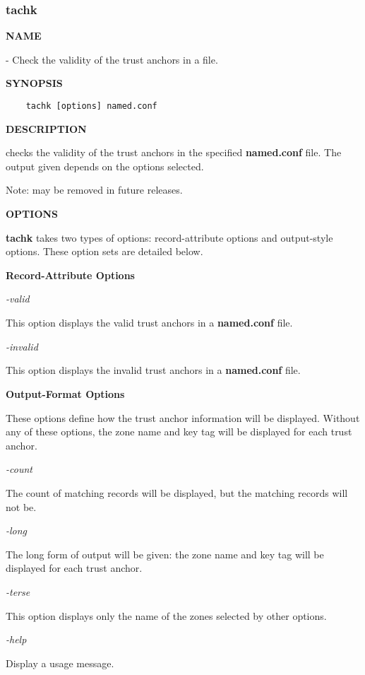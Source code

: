 \clearpage

\subsubsection{\bf tachk}

{\bf NAME}

 - Check the validity of the trust anchors in a 
file.

{\bf SYNOPSIS}

\begin{verbatim}
    tachk [options] named.conf
\end{verbatim}

{\bf DESCRIPTION}

 checks the validity of the trust anchors in the specified
{\bf named.conf} file.  The output given depends on the options selected.

Note:   may be removed in future releases.

{\bf OPTIONS}

{\bf tachk} takes two types of options:  record-attribute options
and output-style options.  These option sets are detailed below.

{\bf Record-Attribute Options}

\begin{description}

\item {\it -valid}\verb" "

This option displays the valid trust anchors in a {\bf named.conf} file.

\item {\it -invalid}\verb" "

This option displays the invalid trust anchors in a {\bf named.conf} file.

\end{description}

{\bf Output-Format Options}

These options define how the trust anchor information will be displayed.
Without any of these options, the zone name and key tag will be displayed
for each trust anchor.

\begin{description}

\item {\it -count}\verb" "

The count of matching records will be displayed, but the matching records
will not be.

\item {\it -long}\verb" "

The long form of output will be given:  the zone name and key tag will be
displayed for each trust anchor.

\item {\it -terse}\verb" "

This option displays only the name of the zones selected by other options.

\item {\it -help}\verb" "

Display a usage message.

\end{description}
